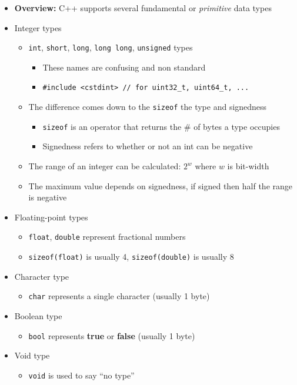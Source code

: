 \documentclass{article}
\begin{document}
\begin{itemize}
	\item \textbf{Overview:} C++ supports several fundamental or \textit{primitive} data types
	\item Integer types \begin{itemize}
		\item \texttt{int}, \texttt{short}, \texttt{long}, \texttt{long long}, \texttt{unsigned} types \begin{itemize}
			\item These names are confusing and non standard
			\item \texttt{\#include <cstdint> // for uint32\_t, uint64\_t, ...}
		\end{itemize}
		\item The difference comes down to the \texttt{sizeof} the type and signedness \begin{itemize}
			\item \texttt{sizeof} is an operator that returns the \# of bytes a type occupies
			\item Signedness refers to whether or not an int can be negative
		\end{itemize}
		\item The range of an integer can be calculated: $2^w$ where $w$ is bit-width
		\item The maximum value depends on signedness, if signed then half the range is negative
	\end{itemize}
	\item Floating-point types \begin{itemize}
		\item \texttt{float}, \texttt{double} represent fractional numbers
		\item \texttt{sizeof(float)} is usually 4, \texttt{sizeof(double)} is usually 8
	\end{itemize}
	\item Character type \begin{itemize}
		\item \texttt{char} represents a single character (usually 1 byte)
	\end{itemize}
	\item Boolean type \begin{itemize}
		\item \texttt{bool} represents \textbf{true} or \textbf{false} (usually 1 byte)
	\end{itemize}
	\item Void type \begin{itemize}
		\item \texttt{void} is used to say ``no type''
	\end{itemize}
\end{itemize}
\end{document}

